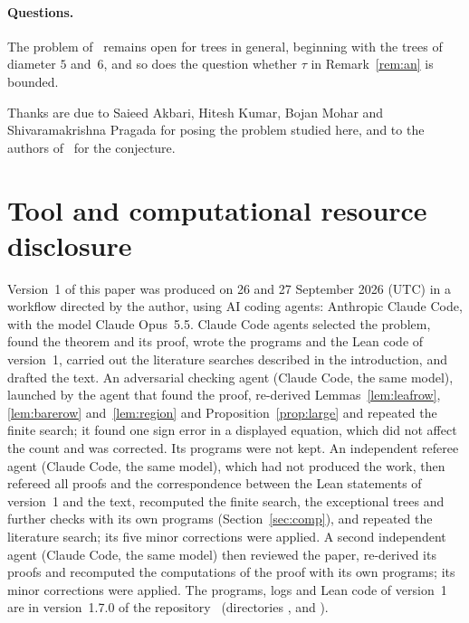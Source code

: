 \documentclass[11pt]{article}
\numberwithin{equation}{section}
\theoremstyle{remark}
\begin{document}
\paragraph{Questions.}
The problem of~\cite{akmp} remains open for trees in general, beginning with
the trees of diameter $5$ and~$6$, and so does the question whether $\tau$ in
Remark~\ref{rem:an} is bounded.

\medskip
\noindent Thanks are due to Saieed Akbari, Hitesh Kumar, Bojan Mohar and
Shivaramakrishna Pragada for posing the problem studied here, and to the authors
of~\cite{afgjl} for the conjecture.

\section*{Tool and computational resource disclosure}
Version~1 of this paper was produced on 26 and 27 September 2026 (UTC) in a
workflow directed by the author, using AI coding agents: Anthropic Claude
Code, with the model Claude Opus~5.5. Claude Code agents selected the problem,
found the theorem and its proof, wrote the programs and the Lean code of
version~1, carried out the literature searches described in the introduction,
and drafted the text. An adversarial checking agent (Claude Code, the same
model), launched by the agent that found the proof, re-derived
Lemmas~\ref{lem:leafrow}, \ref{lem:barerow} and~\ref{lem:region} and
Proposition~\ref{prop:large} and repeated the finite search; it found one sign
error in a displayed equation, which did not affect the count and was
corrected. Its programs were not kept. An independent referee agent (Claude
Code, the same model), which had not produced the work, then refereed all
proofs and the correspondence between the Lean statements of version~1 and the
text, recomputed the finite search, the exceptional trees and further checks
with its own programs (Section~\ref{sec:comp}), and repeated the literature
search; its five minor corrections were applied. A second independent agent
(Claude Code, the same model) then reviewed the paper, re-derived its proofs
and recomputed the computations of the proof with its own programs; its minor
corrections were applied. The programs, logs and Lean code of version~1 are in
version~1.7.0 of the repository~\cite{repo} (directories
,  and ).
\end{document}
